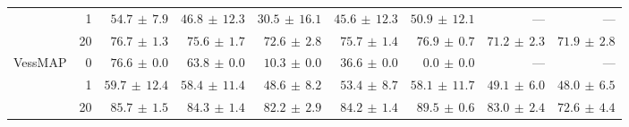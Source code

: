 \documentclass[twocolumn]{article}
\begin{document}
\begin{table}[t]
\begin{tabular}{l r r r r r r r r }
 & 1 & $\mathbf{54.7} \,\pm\, 7.9$ & $46.8 \,\pm\, 12.3$ & $30.5 \,\pm\, 16.1$ & $45.6 \,\pm\, 12.3$ & $50.9 \,\pm\, 12.1$ & --- & --- \\
 & 20 & $76.7 \,\pm\, 1.3$ & $75.6 \,\pm\, 1.7$ & $72.6 \,\pm\, 2.8$ & $75.7 \,\pm\, 1.4$ & $\mathbf{76.9} \,\pm\, 0.7$ & $71.2 \,\pm\, 2.3$ & $71.9 \,\pm\, 2.8$ \\
\hline
\multirow{3}{*}{VessMAP} & 0 & $\mathbf{76.6} \,\pm\, 0.0$ & $63.8 \,\pm\, 0.0$ & $10.3 \,\pm\, 0.0$ & $36.6 \,\pm\, 0.0$ & $0.0 \,\pm\, 0.0$ & --- & --- \\
 & 1 & $\mathbf{59.7} \,\pm\, 12.4$ & $58.4 \,\pm\, 11.4$ & $48.6 \,\pm\, 8.2$ & $53.4 \,\pm\, 8.7$ & $58.1 \,\pm\, 11.7$ & $49.1 \,\pm\, 6.0$ & $48.0 \,\pm\, 6.5$ \\
 & 20 & $85.7 \,\pm\, 1.5$ & $84.3 \,\pm\, 1.4$ & $82.2 \,\pm\, 2.9$ & $84.2 \,\pm\, 1.4$ & $\mathbf{89.5} \,\pm\, 0.6$ & $83.0 \,\pm\, 2.4$ & $72.6 \,\pm\, 4.4$ \\
\hline
\end{tabular}
    \endgroup
\end{table}
\end{document}
